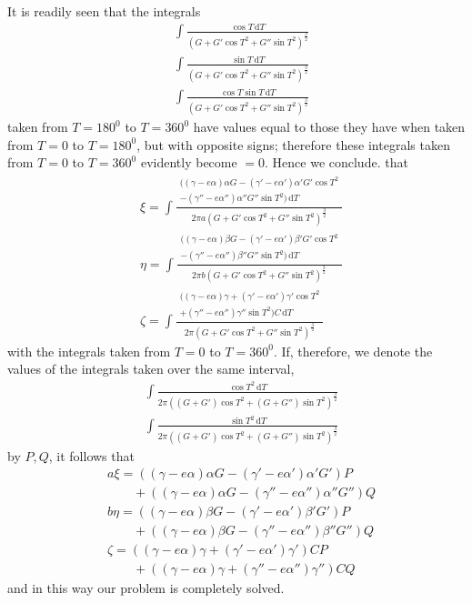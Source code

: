 It is readily seen that the integrals
\[
\begin{aligned}
&\int\frac{\cos T\,\mathrm dT}{(G+G'\cos T^2+G''\sin T^2)^{\frac32}}\\[8pt]
&\int\frac{\sin T\,\mathrm dT}{(G+G'\cos T^2+G''\sin T^2)^{\frac32}}\\[8pt]
&\int\frac{\cos T\sin T\,\mathrm dT}{(G+G'\cos T^2+G''\sin T^2)^{\frac32}}
\end{aligned}
\]
taken from $T=180^0$ to $T=360^0$ have values equal to those they have when taken from $T=0$ to $T=180^0$, but with opposite signs; therefore these integrals taken from $T=0$ to $T=360^0$ evidently become $=0$. Hence we conclude. that
\[
\begin{aligned}
&\xi{}=\int\frac{\begin{gathered}((\gamma-e\alpha)\alpha G-(\gamma'-e\alpha')\alpha'G'\cos T^2\\-(\gamma''-e\alpha'')\alpha''G''\sin T^2)\,\mathrm dT\end{gathered}}{2\pi a(G+G'\cos T^2+G''\sin T^2)^{\frac32}}\\[8pt]
&\eta{}=\int\frac{\begin{gathered}((\gamma-e\alpha)\beta G-(\gamma'-e\alpha')\beta'G'\cos T^2\\-(\gamma''-e\alpha'')\beta''G''\sin T^2)\,\mathrm dT\end{gathered}}{2\pi b(G+G'\cos T^2+G''\sin T^2)^{\frac32}}\\[8pt]
&\zeta{}=\int\frac{\begin{gathered}((\gamma-e\alpha)\gamma+(\gamma'-e\alpha')\gamma'\cos T^2\\+(\gamma''-e\alpha'')\gamma''\sin T^2)C\,\mathrm dT\end{gathered}}{2\pi(G+G'\cos T^2+G''\sin T^2)^{\frac32}}
\end{aligned}
\]
with the integrals taken from $T=0$ to $T=360^0$. If, therefore, we denote the values of the integrals taken over the same interval,
\[
\begin{aligned}
&\int\frac{\cos T^2\,\mathrm dT}{2\pi((G+G')\cos T^2+(G+G'')\sin T^2)^{\frac32}}\\[8pt]
&\int\frac{\sin T^2\,\mathrm dT}{2\pi((G+G')\cos T^2+(G+G'')\sin T^2)^{\frac32}}
\end{aligned}
\]
by $P,Q$, it follows that
\[
\begin{aligned}
&a\xi=((\gamma-e\alpha)\alpha G-(\gamma'-e\alpha')\alpha'G')P\\[6pt]
&\qquad{}+((\gamma-e\alpha)\alpha G-(\gamma''-e\alpha'')\alpha''G'')Q\\[8pt]
&b\eta=((\gamma-e\alpha)\beta G-(\gamma'-e\alpha')\beta'G')P\\[6pt]
&\qquad{}+((\gamma-e\alpha)\beta G-(\gamma''-e\alpha'')\beta''G'')Q\\[8pt]
&\zeta=((\gamma-e\alpha)\gamma+(\gamma'-e\alpha')\gamma')CP\\[6pt]
&\qquad{}+((\gamma-e\alpha)\gamma+(\gamma''-e\alpha'')\gamma'')CQ
\end{aligned}
\]
and in this way our problem is completely solved.
\clearpage
\endgroup
